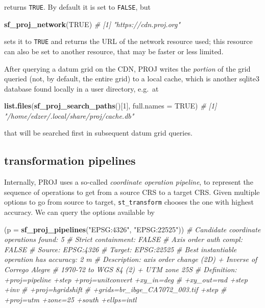 \documentclass[]{book}
\newenvironment{Shaded}{\begin{snugshade}}{\end{snugshade}}
\newcommand{\CommentTok}[1]{\textcolor[rgb]{0.56,0.35,0.01}{\textit{#1}}}
\newcommand{\DataTypeTok}[1]{\textcolor[rgb]{0.13,0.29,0.53}{#1}}
\newcommand{\DecValTok}[1]{\textcolor[rgb]{0.00,0.00,0.81}{#1}}
\newcommand{\KeywordTok}[1]{\textcolor[rgb]{0.13,0.29,0.53}{\textbf{#1}}}
\newcommand{\NormalTok}[1]{#1}
\newcommand{\OtherTok}[1]{\textcolor[rgb]{0.56,0.35,0.01}{#1}}
\newcommand{\StringTok}[1]{\textcolor[rgb]{0.31,0.60,0.02}{#1}}
\begin{document}
returns \texttt{TRUE}. By default it is set to \texttt{FALSE}, but

\begin{Shaded}
\begin{Highlighting}[]
\KeywordTok{sf_proj_network}\NormalTok{(}\OtherTok{TRUE}\NormalTok{)}
\CommentTok{# [1] "https://cdn.proj.org"}
\end{Highlighting}
\end{Shaded}

sets it to \texttt{TRUE} and returns the URL of the network resource used;
this resource can also be set to another resource, that may be
faster or less limited.

After querying a datum grid on the CDN, PROJ writes the \emph{portion} of
the grid queried (not, by default, the entire grid) to a local cache,
which is another sqlite3 database found locally in a user directory,
e.g.~at

\begin{Shaded}
\begin{Highlighting}[]
\KeywordTok{list.files}\NormalTok{(}\KeywordTok{sf_proj_search_paths}\NormalTok{()[}\DecValTok{1}\NormalTok{], }\DataTypeTok{full.names =} \OtherTok{TRUE}\NormalTok{)}
\CommentTok{# [1] "/home/edzer/.local/share/proj/cache.db"}
\end{Highlighting}
\end{Shaded}

that will be searched first in subsequent datum grid queries.

\hypertarget{pipelines}{%
\subsection{transformation pipelines}\label{pipelines}}

Internally, PROJ uses a so-called \emph{coordinate operation pipeline},
to represent the sequence of operations to get from a source CRS to
a target CRS. Given multiple options to go from source to target,
\texttt{st\_transform} chooses the one with highest accuracy. We can query
the options available by

\begin{Shaded}
\begin{Highlighting}[]
\NormalTok{(}\DataTypeTok{p =} \KeywordTok{sf_proj_pipelines}\NormalTok{(}\StringTok{"EPSG:4326"}\NormalTok{, }\StringTok{"EPSG:22525"}\NormalTok{))}
\CommentTok{# Candidate coordinate operations found:  5 }
\CommentTok{# Strict containment:     FALSE }
\CommentTok{# Axis order auth compl:  FALSE }
\CommentTok{# Source:  EPSG:4326 }
\CommentTok{# Target:  EPSG:22525 }
\CommentTok{# Best instantiable operation has accuracy: 2 m}
\CommentTok{# Description: axis order change (2D) + Inverse of Corrego Alegre}
\CommentTok{#              1970-72 to WGS 84 (2) + UTM zone 25S}
\CommentTok{# Definition:  +proj=pipeline +step +proj=unitconvert +xy_in=deg}
\CommentTok{#              +xy_out=rad +step +inv}
\CommentTok{#              +proj=hgridshift}
\CommentTok{#              +grids=br_ibge_CA7072_003.tif +step}
\CommentTok{#              +proj=utm +zone=25 +south +ellps=intl}
\end{Highlighting}
\end{Shaded}
\end{document}
